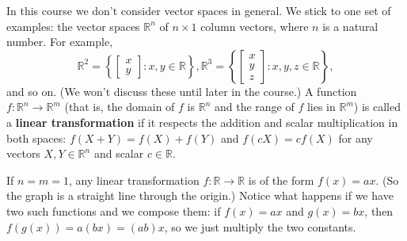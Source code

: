 \documentclass[letterpaper,12pt]{article}
\newcommand{\R}{\mathbb{R}}
\begin{document}
In this course we don't consider vector spaces in general. We stick to one set of examples: the vector spaces $\R^n$ of $n\times 1$ column vectors, where $n$ is a natural number. For example,
\[
 \R^2 = \left\{\begin{bmatrix}x\\y\end{bmatrix} : x,y\in \R\right\}, \R^3 = \left\{\begin{bmatrix}x\\y\\z\end{bmatrix} : x,y,z\in\R\right\}, 
\]
and so on. (We won't discuss these until later in the course.) A function $f:\R^n\to \R^m$ (that is, the domain of $f$ is $\R^n$ and the range of $f$ lies in $\R^m$) is called a {\bf linear transformation} if it respects the addition and scalar multiplication in both spaces: $f(X+Y) = f(X)+f(Y)$ and $f(cX) = cf(X)$ for any vectors  $X,Y\in\R^n$ and scalar $c\in\R$.

If $n=m=1$, any linear transformation $f:\R\to\R$ is of the form $f(x)=ax$. (So the graph is a straight line through the origin.) Notice what happens if we have two such functions and we compose them: if $f(x)=ax$ and $g(x)=bx$, then $f(g(x)) = a(bx) = (ab)x$, so we just multiply the two constants.
\end{document}
